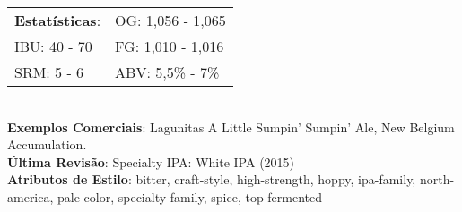 \begin{tabular}{@{}p{35mm}p{35mm}@{}}
  \textbf{Estatísticas}: & OG: 1,056 - 1,065 \\
  IBU: 40 - 70  & FG: 1,010 - 1,016 \\
  SRM: 5 - 6  & ABV: 5,5\% - 7\%
\end{tabular}\\
\textbf{Exemplos Comerciais}: Lagunitas A Little Sumpin' Sumpin' Ale, New Belgium Accumulation. \\
\textbf{Última Revisão}: Specialty IPA: White IPA (2015) \\
\textbf{Atributos de Estilo}: bitter, craft-style, high-strength, hoppy, ipa-family, north-america, pale-color, specialty-family, spice, top-fermented
